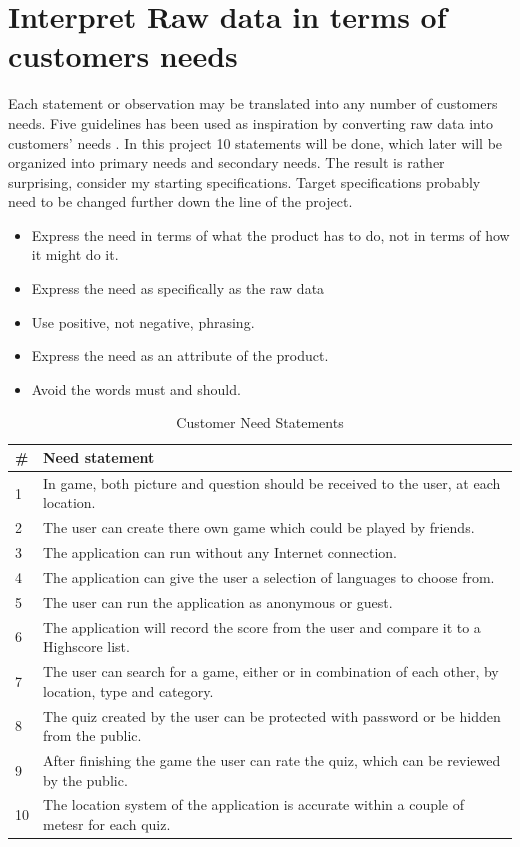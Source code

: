 \documentclass{TDP003mall}
\begin{document}
\pagebreak

\section{Interpret Raw data in terms of customers needs}
Each statement or observation may be translated into any number of customers needs.
Five guidelines has been used as inspiration by converting raw data into customers' needs
\cite[chapter 4, p.~69]{UlrichEppinger}. In this project 10 statements will be done,
which later will be organized into primary needs and secondary needs. The result is rather
surprising, consider my starting specifications. Target specifications probably need to
be changed further down the line of the project.

\begin{itemize}
 	\item Express the need in terms of what the product has to do, not in terms of
	how it might do it.
	\item Express the need as specifically as the raw data
	\item Use positive, not negative, phrasing.
	\item Express the need as an attribute of the product.
	\item Avoid the words must and should.
\end{itemize}

\begin{table}[ht]
\caption{Customer Need Statements}
\centering
\begin{tabular}{l l}
\hline\hline
\# & Need statement \\[0.5ex]
\hline
1 & In game, both picture and question should be received to the user, at each location. \\
2 & The user can create there own game which could be played by friends. \\
3 & The application can run without any Internet connection. \\
4 & The application can give the user a selection of languages to choose from. \\
5 & The user can run the application as anonymous or guest. \\
6 & The application will record the score from the user and compare it to a Highscore list. \\
7 & The user can search for a game, either or in combination of each other, by location, type and category. \\
8 & The quiz created by the user can be protected with password or be hidden from the public. \\
9 & After finishing the game the user can rate the quiz, which can be reviewed by the public. \\
10 & The location system of the application is accurate within a couple of metesr for each quiz. \\ [1ex]
\hline
\end{tabular}
\label{table:CustomerNeedStatements}
\end{table}
\end{document}
